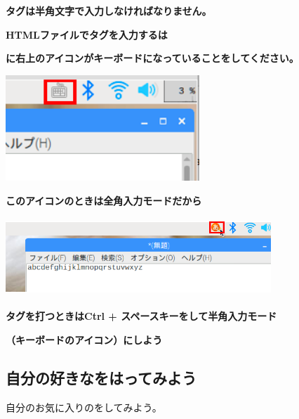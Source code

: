\documentclass[a4paper,12pt]{jarticle}
\begin{document}
\clearpage


{\centering\bfseries
  タグは半角文字で入力しなければなりません。
  \par}

{\centering\bfseries
  HTMLファイルでタグを入力するは
  \par}

{\centering\bfseries
  に右上のアイコンがキーボードになっていることをしてください。
  \par}

\centering
\includegraphics[width=7.301cm,height=3.976cm]{textbook-img159.png}





\bigskip

\bigskip

\bigskip

\bigskip


{\centering\bfseries
  このアイコンのときは全角入力モードだから
  \par}

\centering
\includegraphics[width=10.013cm,height=2.972cm]{textbook-img160.png}


\bigskip


\bigskip

{\centering\bfseries
  タグを打つときはCtrl +
  スペースキーをして半角入力モード
  \par}

{\centering\bfseries
  （キーボードのアイコン）にしよう
  \par}

\clearpage
\flushleft
{}
\subsection{\theExercise 自分の好きなをはってみよう}
\addtocounter{Exercise}{-1}\label{E:embImginHTML}
自分のお気に入りのをしてみよう。
\end{document}
